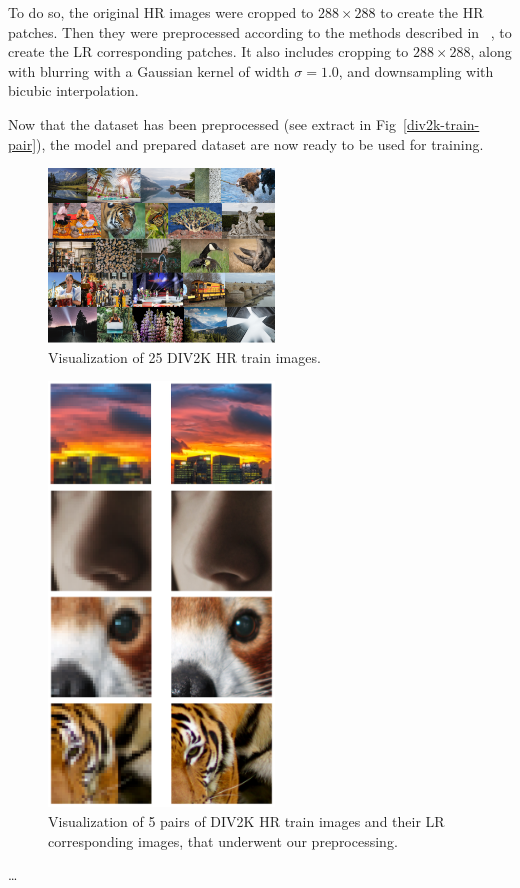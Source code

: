 \documentclass{article}
\begin{document}
{        To do so, the original HR images were cropped to $288 \times 288$ to create the HR patches. Then they were preprocessed according to the methods described in ~\cite{https://doi.org/10.48550/arxiv.1603.08155}, to create the LR corresponding patches. It also includes cropping to $288 \times 288$, along with blurring with a Gaussian kernel of width $\sigma = 1.0$, and downsampling with bicubic interpolation.
        
        Now that the dataset has been preprocessed (see extract in Fig~\ref{div2k-train-pair}), the model and prepared dataset are now ready to be used for training.

        \begin{figure}[ht]
            \centering
            \includegraphics[width=6cm]{images/DIV2K_HR.png}
            \caption{Visualization of 25 DIV2K HR train images.}
            \label{fig:div2k-train-og}
        \end{figure}

        \begin{figure}[ht]
            \centering
            \includegraphics[width=6cm]{images/DIV2K_HRLR.png}
            \caption{Visualization of 5 pairs of DIV2K HR train images and their LR corresponding images, that underwent our preprocessing.}
            \label{fig:div2k-train-pair}
        \end{figure}

        
    …
}
\end{document}
